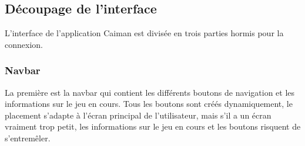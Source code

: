\documentclass[a4paper,12pt,french]{sphinxmanual}
\begin{document}
\begin{sphinxVerbatim}[commandchars=\\\{\}]
                   
                   
                   
                   

                   
                      

                   
                      

                   
                      

                   
                      
\end{sphinxVerbatim}


\subsection{Découpage de l’interface}
\label{\detokenize{organique:decoupage-de-linterface}}
\sphinxAtStartPar
L’interface de l’application Caiman est divisée en trois parties hormis pour la connexion.


\subsubsection{Navbar}
\label{\detokenize{organique:navbar}}
\sphinxAtStartPar
La première est la navbar qui contient les différents boutons de navigation et les informations sur le jeu en cours. Tous les boutons sont créés dynamiquement, le placement s’adapte à l’écran principal de l’utilisateur, mais s’il a un écran vraiment trop petit, les informations sur le jeu en cours et les boutons risquent de s’entremêler.
\end{document}
